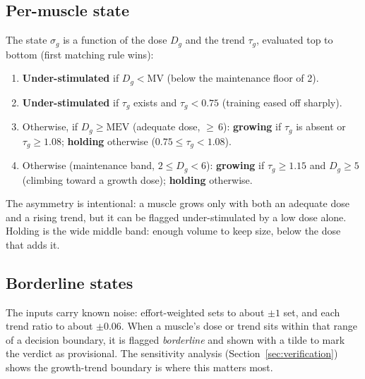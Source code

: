 \documentclass[11pt,a4paper]{article}
\newcommand{\MV}{\mathrm{MV}}
\newcommand{\MEV}{\mathrm{MEV}}
\begin{document}
\subsection{Per-muscle state}
The state $\sigma_g$ is a function of the dose $D_g$ and the trend $\tau_g$, evaluated top to bottom (first matching rule wins):
\begin{enumerate}[label=\arabic*.,leftmargin=*]
\item \textbf{Under-stimulated} if $D_g < \MV$ (below the maintenance floor of 2).
\item \textbf{Under-stimulated} if $\tau_g$ exists and $\tau_g < 0.75$ (training eased off sharply).
\item Otherwise, if $D_g \geq \MEV$ (adequate dose, ${\geq}\,6$): \textbf{growing} if $\tau_g$ is absent or $\tau_g \geq 1.08$; \textbf{holding} otherwise ($0.75 \leq \tau_g < 1.08$).
\item Otherwise (maintenance band, $2 \leq D_g < 6$): \textbf{growing} if $\tau_g \geq 1.15$ and $D_g \geq 5$ (climbing toward a growth dose); \textbf{holding} otherwise.
\end{enumerate}
The asymmetry is intentional: a muscle grows only with both an adequate dose and a rising trend, but it can be flagged under-stimulated by a low dose alone. Holding is the wide middle band: enough volume to keep size, below the dose that adds it.

\subsection{Borderline states}\label{sec:borderline}
The inputs carry known noise: effort-weighted sets to about $\pm 1$ set, and each trend ratio to about $\pm 0.06$. When a muscle's dose or trend sits within that range of a decision boundary, it is flagged \emph{borderline} and shown with a tilde to mark the verdict as provisional. The sensitivity analysis (Section~\ref{sec:verification}) shows the growth-trend boundary is where this matters most.
\end{document}
